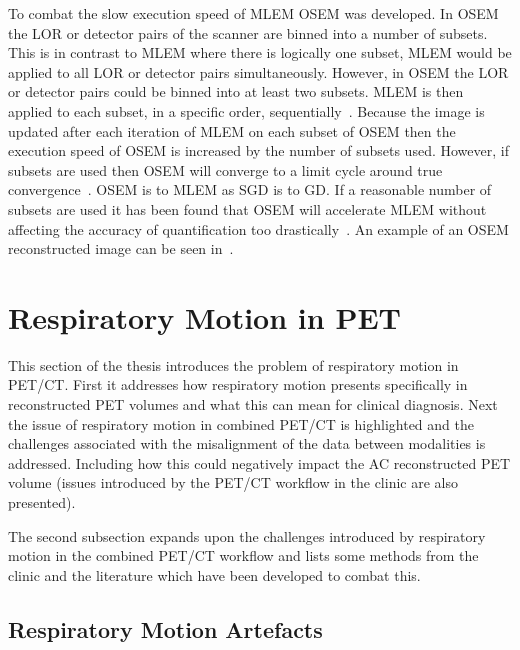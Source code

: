            To combat the slow execution speed of \gls{MLEM} \gls{OSEM} was developed. In \gls{OSEM} the \gls{LOR} or detector pairs of the scanner are binned into a number of subsets. This is in contrast to \gls{MLEM} where there is logically one subset, \gls{MLEM} would be applied to all \gls{LOR} or detector pairs simultaneously. However, in \gls{OSEM} the \gls{LOR} or detector pairs could be binned into at least two subsets. \gls{MLEM} is then applied to each subset, in a specific order, sequentially~\parencite{Hudson1994}. Because the image is updated after each iteration of \gls{MLEM} on each subset of \gls{OSEM} then the execution speed of \gls{OSEM} is increased by the number of subsets used. However, if %
            subsets are used %
            then \gls{OSEM} will converge to a limit cycle around true convergence~\parencite{Mettivier2011}. \gls{OSEM} is to \gls{MLEM} as \gls{SGD} is to \gls{GD}. If a reasonable number of subsets are used it has been found that \gls{OSEM} will accelerate \gls{MLEM} without affecting the accuracy of quantification too drastically~\parencite{Morey2013}. An example of an \gls{OSEM} reconstructed image can be seen in~.
            
    \section{Respiratory Motion in PET} \label{sec:respiratory_motion_in_pet}
        This section of the thesis introduces the problem of respiratory motion in \gls{PET}/\gls{CT}. First it addresses how respiratory motion presents specifically in reconstructed \gls{PET} volumes and what this can mean for clinical diagnosis. Next the issue of respiratory motion in combined \gls{PET}/\gls{CT} is highlighted and the challenges associated with the misalignment of the data between modalities is addressed. Including how this could negatively impact the \gls{AC} reconstructed \gls{PET} volume (issues introduced by the \gls{PET}/\gls{CT} workflow in the clinic are also presented).
            
        The second subsection expands upon the challenges introduced by respiratory motion in the combined \gls{PET}/\gls{CT} workflow and lists some methods from the clinic and the literature which have been developed to combat this.
        
        \subsection{Respiratory Motion Artefacts} \label{sec:respiratory_motion_artefacts}
            
